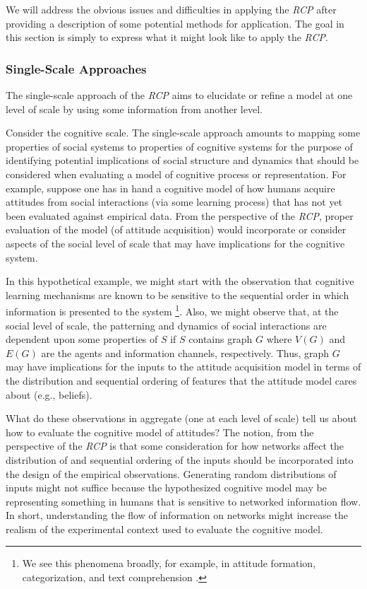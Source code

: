 \documentclass{article}
\begin{document}
We will address the obvious issues and difficulties in applying the \textit{RCP} after providing a description of some potential methods for application.  The goal in this section is simply to express what it might look like to apply the \textit{RCP}.  

\subsubsection{Single-Scale Approaches}
The single-scale approach of the \textit{RCP} aims to elucidate or refine a model at one level of scale by using some information from another level.  

Consider the cognitive scale. The single-scale approach amounts to mapping some properties of social systems to properties of cognitive systems for the purpose of identifying potential implications of social structure and dynamics that should be considered when evaluating a model of cognitive process or representation.  For example, suppose one has in hand a cognitive model of how humans acquire attitudes from social interactions (via some learning process) that has not yet been evaluated against empirical data.  From the perspective of the \textit{RCP}, proper evaluation of the model (of attitude acquisition) would incorporate or consider aspects of the social level of scale that may have implications for the cognitive system.  

In this hypothetical example, we might start with the observation that cognitive learning mechanisms are known to be sensitive to the sequential order in which information is presented to the system \footnote{We see this phenomena broadly, for example,  in attitude formation\cite{cacioppo1992rudimentary}, categorization\cite{heit1994models}, and text comprehension \cite{mcnamara1996learning}.}.   Also, we might observe that, at the social level of scale, the patterning and dynamics of social interactions are dependent upon some properties of $S$ if $S$ contains graph $G$ where $V(G)$ and $E(G)$ are the agents and information channels, respectively. Thus, graph $G$ may have implications for the inputs to the attitude acquisition model in terms of the distribution and sequential ordering of features that the attitude model cares about (e.g., beliefs).  

What do these observations in aggregate (one at each level of scale)  tell us about how to evaluate the cognitive model of attitudes?  The notion, from the perspective of the \textit{RCP} is that some consideration for how networks affect the distribution of and sequential ordering of the inputs should be incorporated into the design of the empirical observations.  Generating random distributions of inputs might not suffice because the hypothesized cognitive model may be representing something in humans that is sensitive to networked information flow.  In short, understanding the flow of information on networks might increase the realism of the experimental context used to evaluate the cognitive model. 
\end{document}
